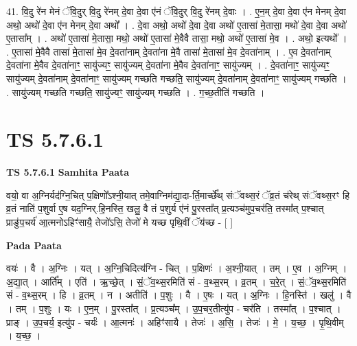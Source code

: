 \documentclass[17pt]{extarticle}
\begin{document}
41. वि॒दु रे॑न मेनं ॅवि॒दुर् वि॒दु रे॑नम् दे॒वा दे॒वा ए॑नं ॅवि॒दुर् वि॒दु रे॑नम् दे॒वाः । . ए॒न॒म् दे॒वा दे॒वा ए॑न मेनम् दे॒वा अथो॒ अथो॑ दे॒वा ए॑न मेनम् दे॒वा अथो᳚ । . दे॒वा अथो॒ अथो॑ दे॒वा दे॒वा अथो॑ ए॒तासा॑ मे॒तासा॒ मथो॑ दे॒वा दे॒वा अथो॑ ए॒तासा᳚म् । . अथो॑ ए॒तासा॑ मे॒तासा॒ मथो॒ अथो॑ ए॒तासा॑ मे॒वैवै तासा॒ मथो॒ अथो॑ ए॒तासा॑ मे॒व । . अथो॒ इत्यथो᳚ । . ए॒तासा॑ मे॒वैवै तासा॑ मे॒तासा॑ मे॒व दे॒वता॑नाम् दे॒वता॑ना मे॒वै तासा॑ मे॒तासा॑ मे॒व दे॒वता॑नाम् । . ए॒व दे॒वता॑नाम् दे॒वता॑ना मे॒वैव दे॒वता॑नाꣳ॒॒ सायु॑ज्यꣳ॒॒ सायु॑ज्यम् दे॒वता॑ना मे॒वैव दे॒वता॑नाꣳ॒॒ सायु॑ज्यम् । . दे॒वता॑नाꣳ॒॒ सायु॑ज्यꣳ॒॒ सायु॑ज्यम् दे॒वता॑नाम् दे॒वता॑नाꣳ॒॒ सायु॑ज्यम् गच्छति गच्छति॒ सायु॑ज्यम् दे॒वता॑नाम् दे॒वता॑नाꣳ॒॒ सायु॑ज्यम् गच्छति । . सायु॑ज्यम् गच्छति गच्छति॒ सायु॑ज्यꣳ॒॒ सायु॑ज्यम् गच्छति । . ग॒च्छ॒तीति॑ गच्छति । \newline
\pagebreak
{}

\section{ TS 5.7.6.1 }

\textbf{TS 5.7.6.1 } \newline
\textbf{Samhita Paata} \newline

वयो॒ वा अ॒ग्निर्यद॑ग्नि॒चित् प॒क्षिणो᳚ऽश्नी॒यात् तमे॒वाग्निम॑द्या॒दा-र्ति॒मार्च्छे᳚थ् संॅवथ्स॒रं ॅव्र॒तं च॑रेथ् संॅवथ्स॒रꣳ हि व्र॒तं नाति॑ प॒शुर्वा ए॒ष यद॒ग्निर्.हि॒नस्ति॒ खलु॒ वै तं प॒शुर्य ए॑नं पु॒रस्ता᳚त् प्र॒त्यञ्च॑मुप॒चर॑ति॒ तस्मा᳚त् प॒श्चात् प्राङु॑प॒चर्य॑ आ॒त्मनोऽहिꣳ॑सायै॒ तेजो॑ऽसि॒ तेजो॑ मे यच्छ पृथि॒वीं ॅय॑च्छ - [  ] \newline

\textbf{Pada Paata} \newline

वयः॑ । वै । अ॒ग्निः । यत् । अ॒ग्नि॒चिदित्य॑ग्नि - चित् । प॒क्षिणः॑ । अ॒श्नी॒यात् । तम् । ए॒व । अ॒ग्निम् । अ॒द्या॒त् । आर्ति᳚म् । एति॑ । ऋ॒च्छे॒त् । सं॒ॅव॒थ्स॒रमिति॑ सं - व॒थ्स॒रम् । व्र॒तम् । च॒रे॒त् । सं॒ॅव॒थ्स॒रमिति॑ सं - व॒थ्स॒रम् । हि । व्र॒तम् । न । अतीति॑ । प॒शुः । वै । ए॒षः । यत् । अ॒ग्निः । हि॒नस्ति॑ । खलु॑ । वै । तम् । प॒शुः । यः । ए॒न॒म् । पु॒रस्ता᳚त् । प्र॒त्यञ्च᳚म् । उ॒प॒चर॒तीत्यु॑प - चर॑ति । तस्मा᳚त् । प॒श्चात् । प्राङ् । उ॒प॒चर्य॒ इत्यु॑प - चर्यः॑ । आ॒त्मनः॑ । अहिꣳ॑सायै । तेजः॑ । अ॒सि॒ । तेजः॑ । मे॒ । य॒च्छ॒ । पृ॒थि॒वीम् । य॒च्छ॒ ।  \newline
\end{document}
